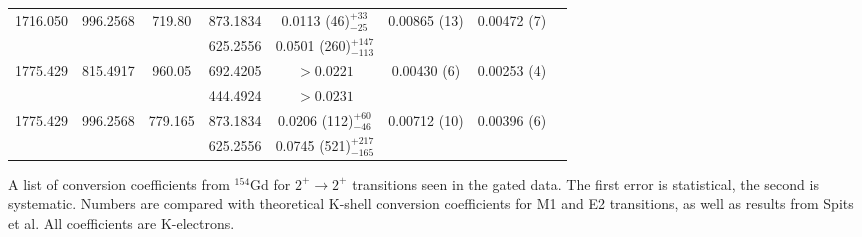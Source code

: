 \begin{sidewaystable}
\begin{longtable}{c|c|c|c|c|c|c|c}
        1716.050 & 996.2568 & 719.80 & 873.1834 & 0.0113 (46)$^{+33}_{-25}$ & 0.00865 (13) & 0.00472 (7) & \\
        &  &  & 625.2556 & 0.0501 (260)$^{+147}_{-113}$ & & &  \\ \hline
        1775.429 & 815.4917 & 960.05 &  692.4205 & $>0.0221$ & 0.00430 (6) & 0.00253 (4) &  \\
        &  &  & 444.4924 & $>0.0231$ & & &  \\ \hline
        1775.429 & 996.2568 & 779.165 & 873.1834 & 0.0206 (112)$^{+60}_{-46}$ & 0.00712 (10) & 0.00396 (6) & \\
        &  &  & 625.2556 & 0.0745 (521)$^{+217}_{-165}$	& & & \\
        \bottomrule
    \end{longtable}
    \item{A list of conversion coefficients from $^{154}$Gd for $2^+\rightarrow 2^+$ transitions seen in the gated data. The first error is statistical, the second is systematic. Numbers are compared with theoretical K-shell conversion coefficients for M1 and E2 transitions, as well as results from Spits et al.\citep{spits96:_154gd} All coefficients are K-electrons.}
\end{sidewaystable}